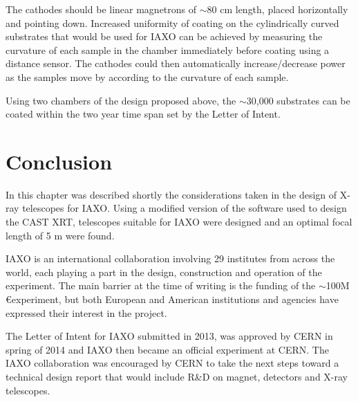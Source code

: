 The cathodes should be linear magnetrons of $\sim$80 cm length, placed horizontally and pointing down. Increased uniformity of coating on the cylindrically curved substrates that would be used for IAXO can be achieved by measuring the curvature of each sample in the chamber immediately before coating using a distance sensor. The cathodes could then automatically increase/decrease power as the samples move by according to the curvature of each sample.

Using two chambers of the design proposed above, the $\sim$30,000 substrates can be coated within the two year time span set by the Letter of Intent.

\section{Conclusion}
In this chapter was described shortly the considerations taken in the design of X-ray telescopes for IAXO. Using a modified version of the software used to design the CAST XRT, telescopes suitable for IAXO were designed and an optimal focal length of 5 m were found.

IAXO is an international collaboration involving 29 institutes from across the world, each playing a part in the design, construction and operation of the experiment. The main barrier at the time of writing is the funding of the $\sim$100M \euro experiment, but both European and American institutions and agencies have expressed their interest in the project.

The Letter of Intent for IAXO submitted in 2013, was approved by CERN in spring of 2014 and IAXO then became an official experiment at CERN. The IAXO collaboration was encouraged by CERN to take the next steps toward a technical design report that would include R\&D on magnet, detectors and X-ray telescopes.
